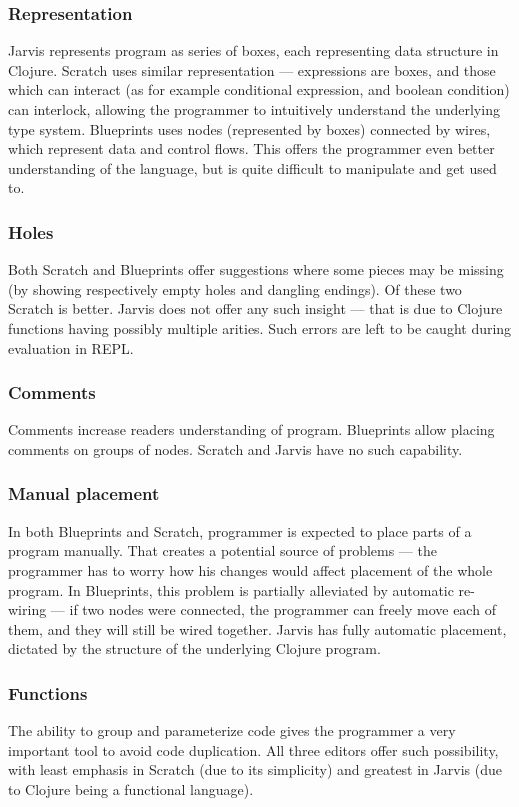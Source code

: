 \documentclass[english,mgr,shortabstract]{iithesis}
\begin{document}
\subsubsection*{Representation}
Jarvis represents program as series of boxes, each representing data structure
in Clojure. Scratch uses similar representation --- expressions are boxes, and
those which can interact (as for example conditional expression, and boolean
condition) can interlock, allowing the programmer to intuitively understand the
underlying type system. Blueprints uses nodes (represented by boxes) connected
by wires, which represent data and control flows. This offers the programmer
even better understanding of the language, but is quite difficult to
manipulate and get used to.

\subsubsection*{Holes}
Both Scratch and Blueprints offer suggestions where some pieces may be missing
(by showing respectively empty holes and dangling endings). Of these two Scratch
is better. Jarvis does not offer any such insight --- that is due to Clojure
functions having possibly multiple arities. Such errors are left to be caught
during evaluation in REPL.\@

\subsubsection*{Comments}
Comments increase readers understanding of program. Blueprints allow placing
comments on groups of nodes. Scratch and Jarvis have no such capability.

\subsubsection*{Manual placement}
In both Blueprints and Scratch, programmer is expected to place parts of
a program manually. That creates a potential source of problems --- the programmer has
to worry how his changes would affect placement of the whole program. In Blueprints,
this problem is partially alleviated by automatic re-wiring --- if two nodes
were connected, the programmer can freely move each of them, and they will still be
wired together. Jarvis has fully automatic placement, dictated by the structure of
the underlying Clojure program. 

\subsubsection*{Functions}
The ability to group and parameterize code gives the programmer a very important tool to
avoid code duplication. All three editors offer such
possibility, with least emphasis in Scratch (due to its simplicity) and
greatest in Jarvis (due to Clojure being a functional language).
\end{document}
